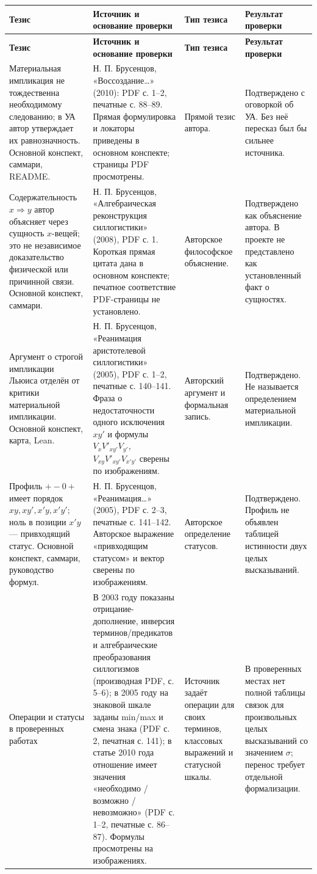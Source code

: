 \documentclass[12pt,a4paper]{article}
\begin{document}
\begin{longtable}{P{0.13\textwidth}P{0.39\textwidth}P{0.15\textwidth}P{0.25\textwidth}}
\toprule
\textbf{Тезис} & \textbf{Источник и основание проверки} & \textbf{Тип тезиса} & \textbf{Результат проверки} \\
\midrule
\endfirsthead
\toprule
\textbf{Тезис} & \textbf{Источник и основание проверки} & \textbf{Тип тезиса} & \textbf{Результат проверки} \\
\midrule
\endhead
Материальная импликация не тождественна необходимому следованию; в УА автор утверждает их равнозначность. Основной конспект, саммари, README. & Н. П. Брусенцов, «Воссоздание…» (2010): PDF с. 1–2, печатные с. 88–89. Прямая формулировка и локаторы приведены в основном конспекте; страницы PDF просмотрены. & Прямой тезис автора. & Подтверждено с оговоркой об УА. Без неё пересказ был бы сильнее источника. \\
Содержательность \(x\Rightarrow y\) автор объясняет через сущность \(x\)-вещей; это не независимое доказательство физической или причинной связи. Основной конспект, саммари. & Н. П. Брусенцов, «Алгебраическая реконструкция силлогистики» (2008), PDF с. 1. Короткая прямая цитата дана в основном конспекте; печатное соответствие PDF-страницы не установлено. & Авторское философское объяснение. & Подтверждено как объяснение автора. В проекте не представлено как установленный факт о сущностях. \\
Аргумент о строгой импликации Льюиса отделён от критики материальной импликации. Основной конспект, карта, Lean. & Н. П. Брусенцов, «Реанимация аристотелевой силлогистики» (2005), PDF с. 1–2, печатные с. 140–141. Фраза о недостаточности одного исключения \(xy'\) и формулы \(V_xV'_{xy'}V_{y'}\), \(V_{xy}V'_{xy'}V_{x'y'}\) сверены по изображениям. & Авторский аргумент и формальная запись. & Подтверждено. Не называется определением материальной импликации. \\
Профиль \(+-0+\) имеет порядок \(xy,xy',x'y,x'y'\); ноль в позиции \(x'y\) — привходящий статус. Основной конспект, саммари, руководство формул. & Н. П. Брусенцов, «Реанимация…» (2005), PDF с. 2–3, печатные с. 141–142. Авторское выражение «привходящим статусом» и вектор сверены по изображениям. & Авторское определение статусов. & Подтверждено. Профиль не объявлен таблицей истинности двух целых высказываний. \\
Операции и статусы в проверенных работах & В 2003 году показаны отрицание-дополнение, инверсия терминов/предикатов и алгебраические преобразования силлогизмов (производная PDF, с. 5–6); в 2005 году на знаковой шкале заданы min/max и смена знака (PDF с. 2, печатная с. 141); в статье 2010 года отношение имеет значения «необходимо / возможно / невозможно» (PDF с. 1–2, печатные с. 86–87). Формулы просмотрены на изображениях. & Источник задаёт операции для своих терминов, классовых выражений и статусной шкалы. & В проверенных местах нет полной таблицы связок для произвольных целых высказываний со значением \(\sigma\); перенос требует отдельной формализации. \\

\end{longtable}
\end{document}
